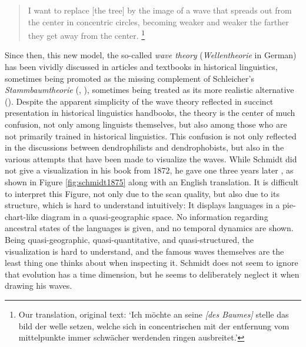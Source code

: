 \documentclass[svgnames,12pt]{scrartcl}
\begin{document}
{\begin{quote} \small I want to replace [the tree] by the image of a wave that spreads out from the
     center in concentric circles, becoming weaker and weaker the farther they get away from the
     center. \citep[27]{Schmidt1872}\footnote{Our translation, original text: `Ich möchte an seine
     \emph{[des Baumes]} stelle das bild der welle setzen, welche sich in concentrischen mit der
     entfernung vom mittelpunkte immer schwächer werdenden ringen ausbreitet.'} 
\end{quote}

Since then, this new model, the
so-called \emph{wave theory} (\emph{Wellentheorie} in German) has been vividly discussed in articles and textbooks in
historical linguistics, sometimes being promoted as the missing complement of Schleicher's
\emph{Stammbaumtheorie} (\citealt[187-200]{Campbell1999}, \citealt{Goebl1983}), sometimes being treated as its more
realistic alternative (\citealt[194f]{Gabelentz1891}).
Despite the apparent simplicity of the wave theory reflected in  succinct presentation in historical linguistics handbooks, the theory is the center of much confusion, not only among linguists
themselves, but also among those who are not primarily trained in historical linguistics.
This confusion is not only reflected in the discussions between dendrophilists and dendrophobists,
but also in the various attempts that have been made to visualize the waves.
While Schmidt did not give a visualization in his book from 1872, he gave one three years later
\citep[199]{Schmidt1875}, as shown in Figure \ref{fig:schmidt1875} along with an English
translation.  It is difficult to interpret this Figure, not only due to the scan quality, but also
due to its structure, which is hard to understand intuitively: It displays languages in a
pie-chart-like diagram in a quasi-geographic space. No information regarding ancestral states of the
languages is given, and no temporal dynamics are shown. Being quasi-geographic, quasi-quantitative,
and quasi-structured, the visualization is hard to understand, and the famous waves themselves are
the least thing one thinks about when inspecting it. Schmidt does not seem to ignore that evolution
has a time dimension, but he seems to deliberately neglect it when drawing his waves.  
 
}
\end{document}
